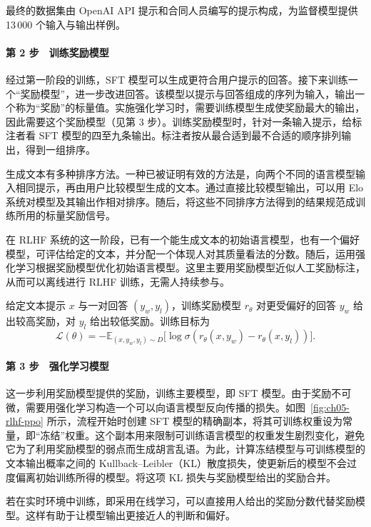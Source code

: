 最终的数据集由 OpenAI API 提示和合同人员编写的提示构成，为监督模型提供 13\,000 个输入与输出样例。

\paragraph*{第 2 步　训练奖励模型}
经过第一阶段的训练，SFT 模型可以生成更符合用户提示的回答。接下来训练一个“奖励模型”，进一步改进回答。该模型以提示与回答组成的序列为输入，输出一个称为“奖励”的标量值。实施强化学习时，需要训练模型生成使奖励最大的输出，因此需要这个奖励模型（见第 3 步）。训练奖励模型时，针对一条输入提示，给标注者看 SFT 模型的四至九条输出。标注者按从最合适到最不合适的顺序排列输出，得到一组排序。

生成文本有多种排序方法。一种已被证明有效的方法是，向两个不同的语言模型输入相同提示，再由用户比较模型生成的文本。通过直接比较模型输出，可以用 Elo 系统对模型及其输出作相对排序。随后，将这些不同排序方法得到的结果规范成训练所用的标量奖励信号。

在 RLHF 系统的这一阶段，已有一个能生成文本的初始语言模型，也有一个偏好模型，可评估给定的文本，并分配一个体现人对其质量看法的分数。随后，运用强化学习根据奖励模型优化初始语言模型。这里主要用奖励模型近似人工奖励标注，从而可以离线进行 RLHF 训练，无需人持续参与。

给定文本提示 $x$ 与一对回答 $(y_w,y_l)$，训练奖励模型 $r_\theta$ 对更受偏好的回答 $y_w$ 给出较高奖励，对 $y_l$ 给出较低奖励。训练目标为
\begin{equation}
\mathcal{L}(\theta)
=-\mathbb{E}_{(x,y_w,y_l)\sim D}
  \bigl[\log\sigma(r_\theta(x,y_w)-r_\theta(x,y_l))\bigr].
\label{eq:ch05-instruct-rm}
\end{equation}

\paragraph*{第 3 步　强化学习模型}
这一步利用奖励模型提供的奖励，训练主要模型，即 SFT 模型。由于奖励不可微，需要用强化学习构造一个可以向语言模型反向传播的损失。如图~\ref{fig:ch05-rlhf-ppo} 所示，流程开始时创建 SFT 模型的精确副本，将其可训练权重设为常量，即“冻结”权重。这个副本用来限制可训练语言模型的权重发生剧烈变化，避免它为了利用奖励模型的弱点而生成胡言乱语。为此，计算冻结模型与可训练模型的文本输出概率之间的 Kullback–Leibler（KL）散度损失，使更新后的模型不会过度偏离初始训练所得的模型。将这项 KL 损失与奖励模型给出的奖励合并。

若在实时环境中训练，即采用在线学习，可以直接用人给出的奖励分数代替奖励模型。这样有助于让模型输出更接近人的判断和偏好。

